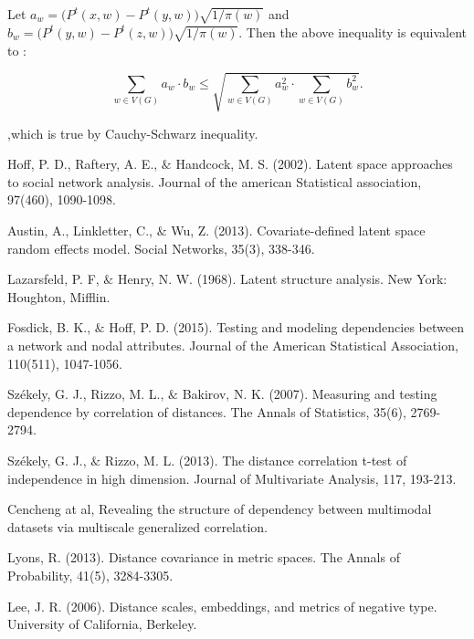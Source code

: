 \documentclass[12pt]{article}
\theoremstyle{definition}
\begin{document}
Let $a_{w} = \big(P^{t}(x,w) - P^{t}(y,w) \big) \sqrt{1 / \pi(w)}$ and $b_{w} = \big( P^{t}(y,w) - P^{t}(z,w) \big) \sqrt{1 / \pi(w)}$. Then the above inequality is equivalent to :

\begin{equation} 
\sum\limits_{w \in V(G)} a_{w} \cdot b_{w} \leq \sqrt{\sum\limits_{w \in V(G)} a^2_{w} \cdot \sum\limits_{w \in V(G)} b^2_{w} }.
\end{equation}

,which is true by Cauchy-Schwarz inequality.




\newpage
\begin{thebibliography}{1}
	
	 Hoff, P. D., Raftery, A. E., $\&$ Handcock, M. S. (2002). Latent space approaches to social network analysis. Journal of the american Statistical association, 97(460), 1090-1098.
	
	
	 Austin, A., Linkletter, C., $\&$ Wu, Z. (2013). Covariate-defined latent space random effects model. Social Networks, 35(3), 338-346.
	
	 Lazarsfeld, P. F, $\&$ Henry, N. W. (1968). Latent structure analysis. New York: Houghton, Mifflin.
	
	 Fosdick, B. K., $\&$ Hoff, P. D. (2015). Testing and modeling dependencies between a network and nodal attributes. Journal of the American Statistical Association, 110(511), 1047-1056.
	
	 Székely, G. J., Rizzo, M. L., $\&$ Bakirov, N. K. (2007). Measuring and testing dependence by correlation of distances. The Annals of Statistics, 35(6), 2769-2794.
	
	
	 Székely, G. J., $\&$ Rizzo, M. L. (2013). The distance correlation t-test of independence in high dimension. Journal of Multivariate Analysis, 117, 193-213.
	
	
	 Cencheng at al, Revealing the structure of dependency between multimodal datasets via multiscale generalized correlation.
	
	
	 Lyons, R. (2013). Distance covariance in metric spaces. The Annals of Probability, 41(5), 3284-3305.
	
	 Lee, J. R. (2006). Distance scales, embeddings, and metrics of negative type. University of California, Berkeley.
	

\end{thebibliography}
\end{document}
